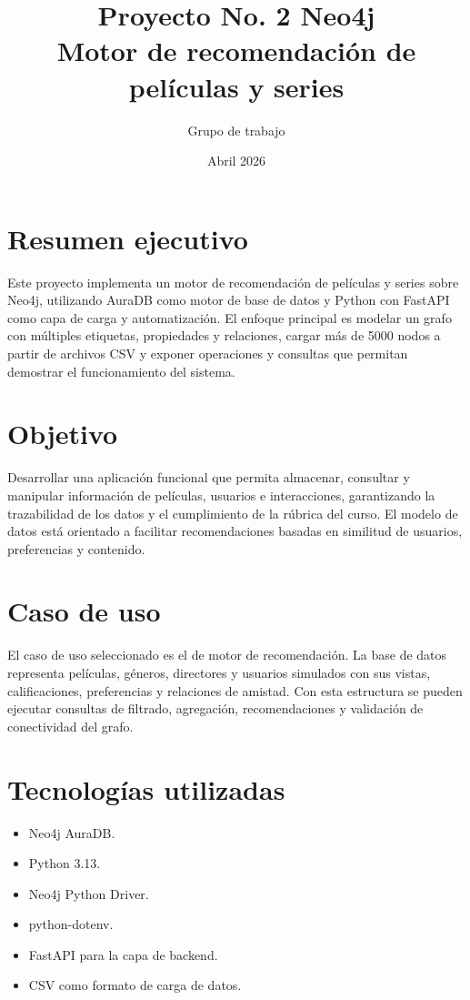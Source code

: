 \documentclass[12pt,a4paper]{article}
\title{Proyecto No. 2 Neo4j\\\large Motor de recomendación de películas y series}
\author{Grupo de trabajo}
\date{Abril 2026}
\begin{document}
\maketitle
\tableofcontents
\newpage

\section{Resumen ejecutivo}

Este proyecto implementa un motor de recomendación de películas y series sobre Neo4j, utilizando AuraDB como motor de base de datos y Python con FastAPI como capa de carga y automatización. El enfoque principal es modelar un grafo con múltiples etiquetas, propiedades y relaciones, cargar más de 5000 nodos a partir de archivos CSV y exponer operaciones y consultas que permitan demostrar el funcionamiento del sistema.

\section{Objetivo}

Desarrollar una aplicación funcional que permita almacenar, consultar y manipular información de películas, usuarios e interacciones, garantizando la trazabilidad de los datos y el cumplimiento de la rúbrica del curso. El modelo de datos está orientado a facilitar recomendaciones basadas en similitud de usuarios, preferencias y contenido.

\section{Caso de uso}

El caso de uso seleccionado es el de motor de recomendación. La base de datos representa películas, géneros, directores y usuarios simulados con sus vistas, calificaciones, preferencias y relaciones de amistad. Con esta estructura se pueden ejecutar consultas de filtrado, agregación, recomendaciones y validación de conectividad del grafo.

\section{Tecnologías utilizadas}

\begin{itemize}
    \item Neo4j AuraDB.
    \item Python 3.13.
    \item Neo4j Python Driver.
    \item python-dotenv.
    \item FastAPI para la capa de backend.
    \item CSV como formato de carga de datos.
\end{itemize}
\end{document}
